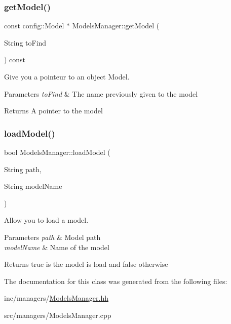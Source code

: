 \subsubsection{\texorpdfstring{get\+Model()}{getModel()}}
{\footnotesize\ttfamily const config\+::\+Model $\ast$ Models\+Manager\+::get\+Model (\begin{DoxyParamCaption}\item[{String}]{to\+Find }\end{DoxyParamCaption}) const}



Give you a pointeur to an object Model. 


\begin{DoxyParams}{Parameters}
{\em to\+Find} & The name previously given to the model \\
\hline
\end{DoxyParams}
\begin{DoxyReturn}{Returns}
A pointer to the model 
\end{DoxyReturn}
\mbox{\label{classModelsManager_a54ac507f91b38c8270f96bca6c639846}} 
\subsubsection{\texorpdfstring{load\+Model()}{loadModel()}}
{\footnotesize\ttfamily bool Models\+Manager\+::load\+Model (\begin{DoxyParamCaption}\item[{String}]{path,  }\item[{String}]{model\+Name }\end{DoxyParamCaption})}



Allow you to load a model. 


\begin{DoxyParams}{Parameters}
{\em path} & Model path \\
\hline
{\em model\+Name} & Name of the model \\
\hline
\end{DoxyParams}
\begin{DoxyReturn}{Returns}
true is the model is load and false otherwise 
\end{DoxyReturn}


The documentation for this class was generated from the following files\+:\begin{DoxyCompactItemize}
\item 
inc/managers/\hyperlink{ModelsManager_8hh}{Models\+Manager.\+hh}\item 
src/managers/Models\+Manager.\+cpp\end{DoxyCompactItemize}
